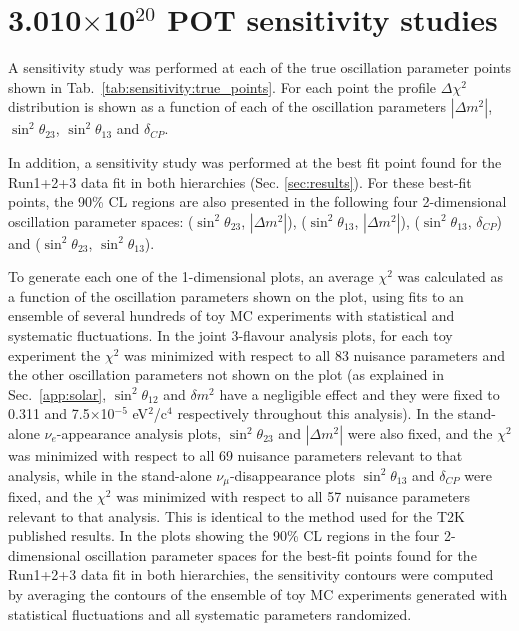 \clearpage

\section{3.010$\times$10$^{20}$ POT sensitivity studies}
\label{app:sensitivity}

A sensitivity study was performed at each of the true oscillation parameter points shown in Tab.\ \ref{tab:sensitivity:true_points}.
For each point the profile $\Delta\chi^2$ distribution is shown as a function of each of the oscillation parameters
$|\Delta m^{2}|$, $\sin^{2}\theta_{23}$, $\sin^{2}\theta_{13}$ and $\delta_{CP}$. 

In addition, a sensitivity study was performed at the best fit point found for the Run1+2+3 data fit in both hierarchies (Sec. \ref{sec:results}).
For these best-fit points, the 90\% CL regions are also presented
in the following four 2-dimensional oscillation parameter spaces:
($\sin^{2}\theta_{23}$, $|\Delta m^{2}|$),
($\sin^{2}\theta_{13}$, $|\Delta m^{2}|$),
($\sin^{2}\theta_{13}$, $\delta_{CP}$) and
($\sin^{2}\theta_{23}$, $\sin^{2}\theta_{13}$).

To generate each one of the 1-dimensional plots, an average $\chi^2$ was calculated as a function of the oscillation parameters shown on the plot,
using fits to an ensemble of several hundreds of toy MC experiments with statistical and systematic fluctuations. 
In the joint 3-flavour analysis plots, for each toy experiment the $\chi^2$ was minimized with respect to all 83 nuisance parameters and 
the other oscillation parameters 
not shown on the plot (as explained in Sec.\ \ref{app:solar}, $\sin^{2}\theta_{12}$ and $\delta m^{2}$ have a negligible effect and they were fixed to
0.311 and 7.5$\times$10$^{-5}$ eV$^{2}$/c$^{4}$ respectively throughout this analysis).
In the stand-alone $\nu_{e}$-appearance analysis plots, $\sin^{2}\theta_{23}$ and $|\Delta m^{2}|$ were also fixed,
and the $\chi^2$ was minimized with respect to all 69 nuisance parameters relevant to that analysis,  
while in the stand-alone $\nu_{\mu}$-disappearance plots $\sin^{2}\theta_{13}$ and $\delta_{CP}$ were fixed, 
and the $\chi^2$ was minimized with respect to all 57 nuisance parameters relevant to that analysis. 
This is identical to the method used for the T2K published results. 
In the plots showing the 90\% CL regions in the four 2-dimensional oscillation parameter spaces
for the best-fit points found for the Run1+2+3 data fit in both hierarchies,
the sensitivity contours were computed by averaging the contours of the ensemble of toy MC experiments
generated with statistical fluctuations and all systematic parameters randomized.

